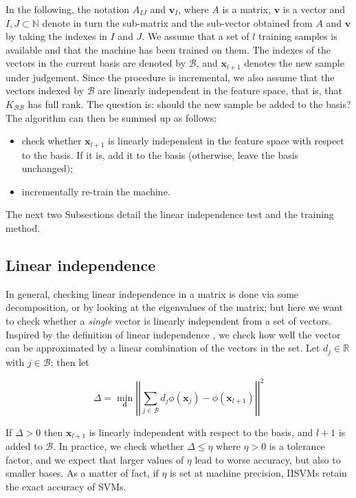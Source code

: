 \documentclass[10pt,twocolumn,letterpaper]{article}
\def\RR{\mathbb{R}}
\def\NN{\mathbb{N}}
\def\xx{\mathbf{x}}
\def\dd{\mathbf{d}}
\def\b{\mathcal{B}}
\begin{document}
In the following, the notation $A_{IJ}$ and $\mathbf{v}_I$, where $A$
is a matrix, $\mathbf{v}$ is a vector and $I,J \subset \NN$ denote in
turn the sub-matrix and the sub-vector obtained from $A$ and
$\mathbf{v}$ by taking the indexes in $I$ and $J$. We assume that a
set of $l$ training samples is available and that the machine has been
trained on them. The indexes of the vectors in the current basis are
denoted by $\b$, and $\xx_{l+1}$ denotes the new sample under
judgement. Since the procedure is incremental, we also assume that the
vectors indexed by $\b$ are linearly independent in the feature space,
that is, that $K_{\b\b}$ has full rank. The question is: should the
new sample be added to the basis? The algorithm can then be summed up
as follows:

\begin{itemize}

  \item check whether $\xx_{l+1}$ is linearly independent in the
        feature space with respect to the basis. If it is, add it to
        the basis (otherwise, leave the basis unchanged);

  \item incrementally re-train the machine.

\end{itemize}

The next two Subsections detail the linear independence test and the
training method.

\subsection{Linear independence}

In general, checking linear independence in a matrix is done via some
decomposition, or by looking at the eigenvalues of the matrix; but
here we want to check whether a \emph{single} vector is linearly
independent from a set of vectors. Inspired by the definition of
linear independence \cite{EngelMM02sparse}, we check how well the
vector can be approximated by a linear combination of the vectors in
the set. Let $d_j \in \RR$ with $j \in \b$; then let

\begin{equation} \label{eqn:ald1}
  \Delta = \min_\dd \left|\left|\sum_{j \in \b} d_j \phi(\xx_j) - \phi(\xx_{l+1}) \right|\right|^2
\end{equation}

If $\Delta > 0$ then $\xx_{l+1}$ is linearly independent with respect
to the basis, and $l+1$ is added to $\b$. In practice, we check
whether $\Delta \leq \eta$ where $\eta > 0$ is a tolerance factor, and
we expect that larger values of $\eta$ lead to worse accuracy, but also
to smaller bases. As a matter of fact, if $\eta$ is set at machine
precision, IISVMs retain the exact accuracy of SVMs.
\end{document}
